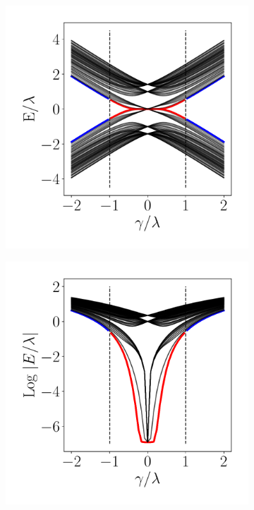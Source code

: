 \begin{figure}[h!]
     \centering
    \captionsetup[sub]{font=small}
     \begin{subfigure}[b!]{0.2 \textwidth}
         \caption{}
         \includegraphics[width=\textwidth]{Imagenes/Resultados_Hoti_Fractal/bands_square_shh.pdf}
     \end{subfigure}\hspace*{-0.5em}
     \begin{subfigure}[b!]{0.2 \textwidth}
         \caption{}
         \includegraphics[width=\textwidth]{Imagenes/Resultados_Hoti_Fractal/bands_square_shh_log.pdf}

\end{subfigure}
\end{figure}
